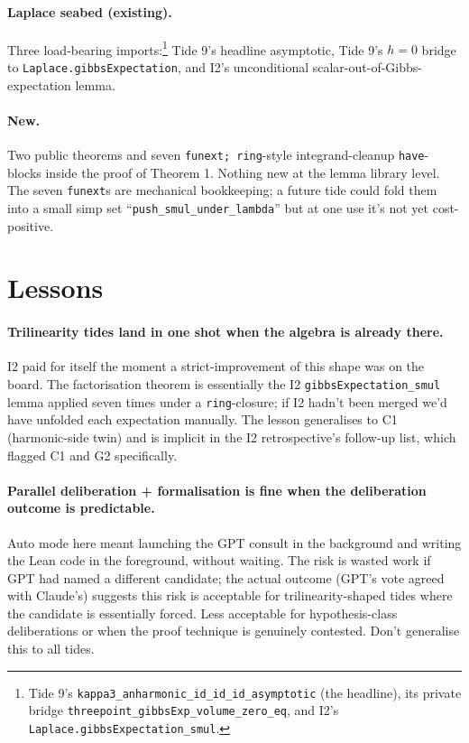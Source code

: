 \documentclass[11pt]{article}
\begin{document}
\paragraph{Laplace seabed (existing).} Three load-bearing
imports:\footnote{Tide 9's
\texttt{kappa3\_anharmonic\_id\_id\_id\_asymptotic} (the headline),
its private bridge \texttt{threepoint\_gibbsExp\_volume\_zero\_eq},
and I2's \texttt{Laplace.gibbsExpectation\_smul}.}
Tide 9's headline asymptotic, Tide 9's $h = 0$ bridge to
\texttt{Laplace.gibbsExpectation}, and I2's unconditional
scalar-out-of-Gibbs-expectation lemma.

\paragraph{New.} Two public theorems and seven
\texttt{funext;\,ring}-style integrand-cleanup \texttt{have}-blocks
inside the proof of Theorem 1. Nothing new at the lemma library level.
The seven \texttt{funext}s are mechanical bookkeeping; a future tide
could fold them into a small simp set
``\texttt{push\_smul\_under\_lambda}'' but at one use it's not yet
cost-positive.

\section{Lessons}

\paragraph{Trilinearity tides land in one shot when the algebra is
already there.} I2 paid for itself the moment a strict-improvement of
this shape was on the board. The factorisation theorem is essentially
the I2 \texttt{gibbsExpectation\_smul} lemma applied seven times under a
\texttt{ring}-closure; if I2 hadn't been merged we'd have unfolded each
expectation manually. The lesson generalises to C1 (harmonic-side
twin) and is implicit in the I2 retrospective's follow-up list, which
flagged C1 and G2 specifically.

\paragraph{Parallel deliberation + formalisation is fine when the
deliberation outcome is predictable.} Auto mode here meant launching
the GPT consult in the background and writing the Lean code in the
foreground, without waiting. The risk is wasted work if GPT had named
a different candidate; the actual outcome (GPT's vote agreed with
Claude's) suggests this risk is acceptable for trilinearity-shaped
tides where the candidate is essentially forced. Less acceptable for
hypothesis-class deliberations or when the proof technique is
genuinely contested. Don't generalise this to all tides.
\end{document}
